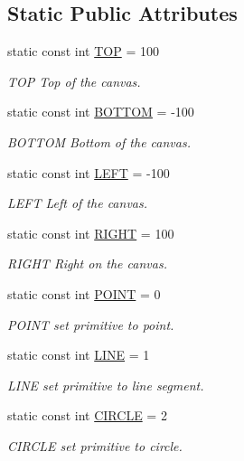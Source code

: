 \subsection*{Static Public Attributes}
\begin{DoxyCompactItemize}
\item 
static const int \hyperlink{class_canvas_a3d5a1c71903689cf817cd92ae7a2ebc9}{T\+OP} = 100
\begin{DoxyCompactList}\small\item\em T\+OP Top of the canvas. \end{DoxyCompactList}\item 
static const int \hyperlink{class_canvas_a0630c650c5daea2db5a01ce6c0954457}{B\+O\+T\+T\+OM} = -\/100
\begin{DoxyCompactList}\small\item\em B\+O\+T\+T\+OM Bottom of the canvas. \end{DoxyCompactList}\item 
static const int \hyperlink{class_canvas_a7da74603fc4232dfe00be701878d048b}{L\+E\+FT} = -\/100
\begin{DoxyCompactList}\small\item\em L\+E\+FT Left of the canvas. \end{DoxyCompactList}\item 
static const int \hyperlink{class_canvas_ab618bb921e1c0ee7c394fe3a83b17271}{R\+I\+G\+HT} = 100
\begin{DoxyCompactList}\small\item\em R\+I\+G\+HT Right on the canvas. \end{DoxyCompactList}\item 
static const int \hyperlink{class_canvas_a04b852dd0b2561a20a5e0e9f67a95b64}{P\+O\+I\+NT} = 0
\begin{DoxyCompactList}\small\item\em P\+O\+I\+NT set primitive to point. \end{DoxyCompactList}\item 
static const int \hyperlink{class_canvas_a28b792bd16aaf737eab6d697a211183a}{L\+I\+NE} = 1
\begin{DoxyCompactList}\small\item\em L\+I\+NE set primitive to line segment. \end{DoxyCompactList}\item 
static const int \hyperlink{class_canvas_a6d5c5da10948c78b6481ac831f32106f}{C\+I\+R\+C\+LE} = 2
\begin{DoxyCompactList}\small\item\em C\+I\+R\+C\+LE set primitive to circle. \end{DoxyCompactList}\item 

\end{DoxyCompactItemize}
